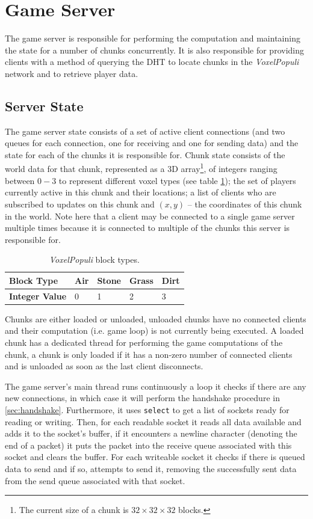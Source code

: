 \documentclass[10pt,twoside,notitlepage,a4paper]{report}
\newcommand{\voxpop}{\emph{VoxelPopuli}}
\begin{document}
	\section{Game Server}
	The game server is responsible for performing the computation and maintaining the state for a number of chunks concurrently. It is also responsible for providing clients with a method of querying the DHT to locate chunks in the \voxpop{} network and to retrieve player data.
	
	\subsection{Server State}
	The game server state consists of a set of active client connections (and two queues for each connection, one for receiving and one for sending data) and the state for each of the chunks it is responsible for. Chunk state consists of the world data for that chunk, represented as a 3D array\footnote{The current size of a chunk is $32\times32\times32$ blocks.},  of integers ranging between $0-3$ to represent different voxel types (see table \ref{tab:blocks}); the set of players currently active in this chunk and their locations; a list of clients who are subscribed to updates on this chunk and $(x,y)$ -- the coordinates of this chunk in the world. Note here that a client may be connected to a single game server multiple times because it is connected to multiple of the chunks this server is responsible for.
	
	\begin{table}
		\centering
		\begin{tabularx}{0.65\textwidth}{| l | l | l | l | X |}
			\hline
			\textbf{Block Type} & Air & Stone & Grass & Dirt \\
			\hline
			\textbf{Integer Value} & 0 & 1 & 2 & 3 \\
			\hline
		\end{tabularx}
		\caption{\voxpop{} block types.}
		\label{tab:blocks}
	\end{table}
	
	Chunks are either loaded or unloaded, unloaded chunks have no connected clients and their computation (i.e. game loop) is not currently being executed. A loaded chunk has a dedicated thread for performing the game computations of the chunk, a chunk is only loaded if it has a non-zero number of connected clients and is unloaded as soon as the last client disconnects.
	
	The game server's main thread runs continuously a loop it checks if there are any new connections, in which case it will perform the handshake procedure in \cref{sec:handshake}. Furthermore, it uses \texttt{select} to get a list of sockets ready for reading or writing. Then, for each readable socket it reads all data available and adds it to the socket's buffer, if it encounters a newline character (denoting the end of a packet) it puts the packet into the receive queue associated with this socket and clears the buffer. For each writeable socket it checks if there is queued data to send and if so, attempts to send it, removing the successfully sent data from the send queue associated with that socket.
	
\end{document}
